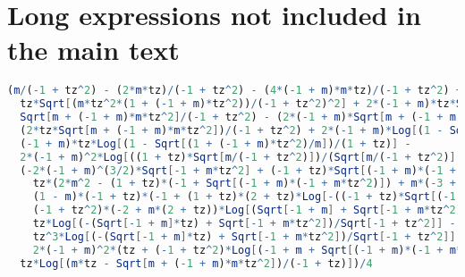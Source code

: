 \chapter{Long expressions not included in the main text\label{cha:long_expression}}
\begin{lstlisting}[breaklines=true, caption={Expression for Type-II interband transition with \( t_z > 1 \), given in Mathematica format.\label{lst:typeii-interband-tzpos}},language=Mathematica]
(m/(-1 + tz^2) - (2*m*tz)/(-1 + tz^2) - (4*(-1 + m)*m*tz)/(-1 + tz^2) + (m*tz^2)/(-1 + tz^2) +
  tz*Sqrt[(m*tz^2*(1 + (-1 + m)*tz^2))/(-1 + tz^2)^2] + 2*(-1 + m)*tz*Sqrt[(m*tz^2*(1 + (-1 + m)*tz^2))/(-1 + tz^2)^2] -
  Sqrt[m + (-1 + m)*m*tz^2]/(-1 + tz^2) - (2*(-1 + m)*Sqrt[m + (-1 + m)*m*tz^2])/(-1 + tz^2) +
  (2*tz*Sqrt[m + (-1 + m)*m*tz^2])/(-1 + tz^2) + 2*(-1 + m)*Log[(1 - Sqrt[(1 + (-1 + m)*tz^2)/m])/(1 + tz)] +
  (-1 + m)*tz*Log[(1 - Sqrt[(1 + (-1 + m)*tz^2)/m])/(1 + tz)] -
  2*(-1 + m)^2*Log[((1 + tz)*Sqrt[m/(-1 + tz^2)])/(Sqrt[m/(-1 + tz^2)] - Sqrt[(1 + (-1 + m)*tz^2)/(-1 + tz^2)])] -
  (-2*(-1 + m)^(3/2)*Sqrt[-1 + m*tz^2] + (-1 + tz)*Sqrt[(-1 + m)*(-1 + m*tz^2)] -
    tz*(2*m^2 - (1 + tz)*(-1 + Sqrt[(-1 + m)*(-1 + m*tz^2)]) + m*(-3 + tz*(-1 + 2*Sqrt[(-1 + m)*(-1 + m*tz^2)]))) -
    (1 - m)*(-1 + tz)*(-1 + (1 + tz)*(2 + tz)*Log[-((-1 + tz)*Sqrt[(-1 + m)/(-1 + tz^2)])]) -
    (-1 + tz^2)*(-2 + m*(2 + tz))*Log[(Sqrt[-1 + m] + Sqrt[-1 + m*tz^2])/Sqrt[-1 + tz^2]] +
    tz*Log[(-(Sqrt[-1 + m]*tz) + Sqrt[-1 + m*tz^2])/Sqrt[-1 + tz^2]] -
    tz^3*Log[(-(Sqrt[-1 + m]*tz) + Sqrt[-1 + m*tz^2])/Sqrt[-1 + tz^2]] -
    2*(-1 + m)^2*(tz + (-1 + tz^2)*Log[(-1 + m + Sqrt[(-1 + m)*(-1 + m*tz^2)])/(-1 + m + tz - m*tz)]))/(-1 + tz^2) -
  tz*Log[(m*tz - Sqrt[m + (-1 + m)*m*tz^2])/(-1 + tz)])/4
\end{lstlisting}


